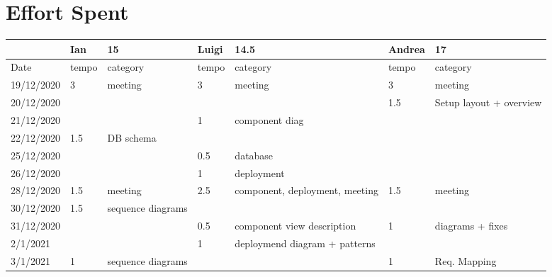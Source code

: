 
\section{Effort Spent}
\begin{table}[H]
    \begin{tabular}{|l|l|p{2.5cm}|l|p{2.5cm}|l|p{2.5cm}|}
        \hline
        & Ian   & 15                     & Luigi & 14.5                           & Andrea & 17                      \\
        \hline
        Date       & tempo & category              & tempo & category                      & tempo  & category               \\
        \hline
        19/12/2020 & 3     & meeting                & 3     & meeting                        & 3      & meeting                 \\
        20/12/2020 &       &                        &       &                                & 1.5    & Setup layout + overview \\
        21/12/2020 &       &                        & 1     & component diag                 &        &                         \\
        22/12/2020 & 1.5   & DB schema              &       &                                &        &                         \\
        25/12/2020 &       &                        & 0.5   & database                       &        &                         \\
        26/12/2020 &       &                        & 1     & deployment                     &        &                         \\
        28/12/2020 & 1.5   & meeting                & 2.5   & component, deployment, meeting & 1.5    & meeting                 \\
        30/12/2020 & 1.5   & sequence diagrams      &       &                                &        &                         \\
        31/12/2020 &       &                        & 0.5   & component view description     & 1      & diagrams + fixes        \\
        2/1/2021   &       &                        & 1     & deploymend diagram + patterns  &        &                         \\
        3/1/2021   & 1     & sequence diagrams      &       &                                & 1      & Req. Mapping            \\

\end{tabular}
\end{table}
